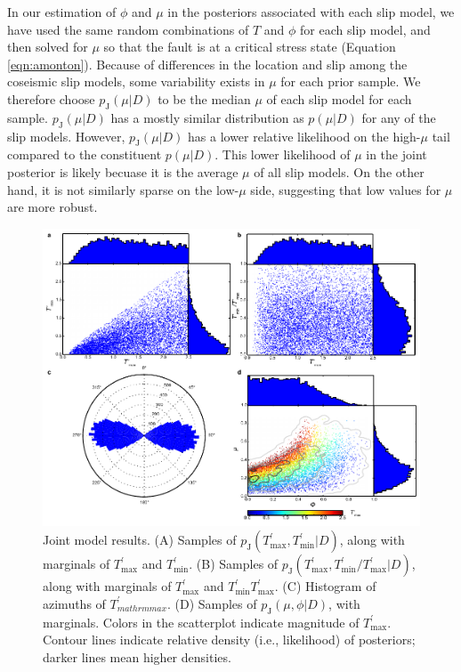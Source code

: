 \documentclass[twocolumn,jgrga]{AGUTeX}
\begin{document}
\begin{article}
In our estimation of $\phi$ and $\mu$ in the posteriors associated with
each slip model, we have used the same random combinations of $T$ and
$\phi$ for each slip model, and then solved for $\mu$ so that the fault
is at a critical stress state (Equation \ref{eqn:amonton}). Because of
differences in the location and slip among the coseismic slip models,
some variability exists in $\mu$ for each prior sample. We therefore
choose $p_{\mathrm{J}}(\mu | D)$ to be the median $\mu$ of each slip
model for each sample. $p_{\mathrm{J}}(\mu | D)$ has a mostly similar
distribution as $p(\mu | D)$ for any of the slip models. However,
$p_{\mathrm{J}}(\mu | D)$ has a lower relative likelihood on the
high-$\mu$ tail compared to the constituent $p(\mu | D)$. This lower
likelihood of $\mu$ in the joint posterior is likely becuase it is the
average $\mu$ of all slip models. On the other hand, it is not similarly
sparse on the low-$\mu$ side, suggesting that low values for $\mu$ are
more robust.

\begin{figure}[t]
\centering
\includegraphics[width=40pc]{../figures/joint_pdfs.pdf}
\caption{Joint model results. (A) Samples of
$p_{\mathrm{J}}(T^\prime_{\mathrm{max}},T^\prime_{\mathrm{min}} | D)$,
along with marginals of $T^\prime_{\mathrm{max}}$ and
$T^\prime_{\mathrm{min}}$. (B) Samples of
$p_{\mathrm{J}}(T^\prime_{\mathrm{max}}, T^\prime_{\mathrm{min}}/T^\prime_{\mathrm{max}} | D)$,
along with marginals of $T^\prime_{\mathrm{max}}$ and
$T^\prime_{\mathrm{min}}T^\prime_{\mathrm{max}}$. (C) Histogram of
azimuths of $T^\prime_{mathrm{max}}$. (D) Samples of
$p_{\mathrm{J}}(\mu, \phi | D)$, with marginals. Colors in the
scatterplot indicate magnitude of $T^\prime_{\mathrm{max}}$. Contour
lines indicate relative density (i.e., likelihood) of posteriors; darker
lines mean higher densities.}
\label{fig:joint_posteriors}
\end{figure}


\end{article}
\end{document}
